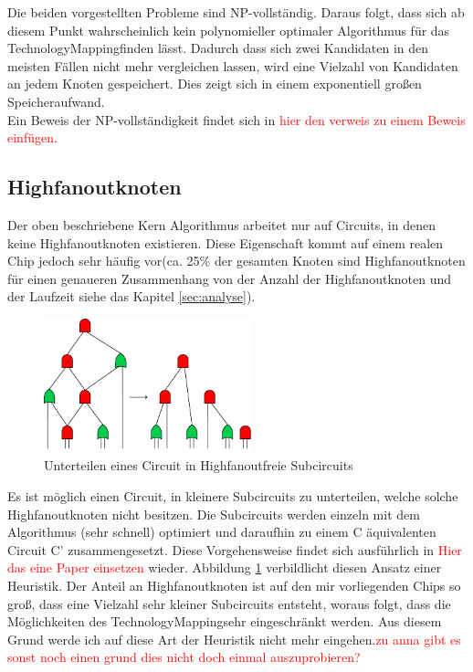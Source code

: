 \documentclass[11pt, a4paper, german]{article}
\newcommand{\TM}{TechnologyMapping}
\begin{document}
Die beiden vorgestellten Probleme sind NP-vollständig. Daraus folgt, dass sich ab diesem Punkt wahrscheinlich  kein polynomieller optimaler Algorithmus für das \TM finden lässt. Dadurch dass sich zwei Kandidaten in den meisten Fällen nicht mehr vergleichen lassen, wird eine Vielzahl von Kandidaten an jedem Knoten gespeichert. Dies zeigt sich in einem exponentiell großen Speicheraufwand. \\
Ein Beweis der NP-vollständigkeit findet sich in \textcolor{red}{hier den verweis zu einem Beweis einfügen}.

\subsection{Highfanoutknoten}
\label{subsec:highfanout}
Der oben beschriebene Kern Algorithmus arbeitet nur auf Circuits, in denen keine Highfanoutknoten existieren. Diese Eigenschaft kommt auf einem realen Chip jedoch sehr häufig vor(ca. 25\% der gesamten Knoten sind Highfanoutknoten für einen genaueren Zusammenhang von der Anzahl der Highfanoutknoten und der Laufzeit siehe das Kapitel \ref{sec:analyse}).\\
 \begin{figure}
		\includegraphics[width = 6cm]{pictures/compiled/ohne_highfanout_heu}
		\caption{Unterteilen eines Circuit in Highfanoutfreie Subcircuits}
		\label{bild:ohne_highfanout_heu}
\end{figure}
 Es ist möglich einen Circuit, in kleinere Subcircuits zu unterteilen, welche solche Highfanoutknoten nicht besitzen. Die Subcircuits werden einzeln mit dem Algorithmus (sehr schnell) optimiert und daraufhin zu einem C äquivalenten Circuit C' zusammengesetzt. Diese Vorgehensweise findet sich ausführlich in \textcolor{red}{Hier das eine Paper einsetzen} wieder. Abbildung \ref{bild:ohne_highfanout_heu} verbildlicht diesen Ansatz einer Heuristik. 
  Der Anteil an Highfanoutknoten ist auf den mir vorliegenden Chips so groß, dass eine Vielzahl sehr kleiner Subcircuits entsteht, woraus folgt, dass die Möglichkeiten des \TM sehr eingeschränkt werden. Aus diesem Grund werde ich auf diese Art der   Heuristik nicht mehr eingehen.\textcolor{red}{zu anna gibt es sonst noch einen grund dies nicht doch einmal auszuprobieren?}\\
\end{document}
